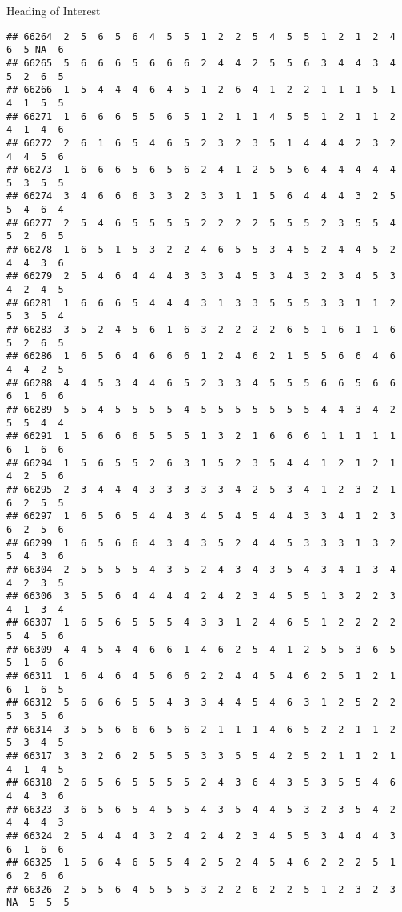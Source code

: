 \documentclass[
  ignorenonframetext,
]{beamer}
\begin{document}
\begin{frame}[fragile]{Heading of Interest}
\begin{verbatim}
## 66264  2  5  6  5  6  4  5  5  1  2  2  5  4  5  5  1  2  1  2  4  6  5 NA  6
## 66265  5  6  6  6  5  6  6  6  2  4  4  2  5  5  6  3  4  4  3  4  5  2  6  5
## 66266  1  5  4  4  4  6  4  5  1  2  6  4  1  2  2  1  1  1  5  1  4  1  5  5
## 66271  1  6  6  6  5  5  6  5  1  2  1  1  4  5  5  1  2  1  1  2  4  1  4  6
## 66272  2  6  1  6  5  4  6  5  2  3  2  3  5  1  4  4  4  2  3  2  4  4  5  6
## 66273  1  6  6  6  5  6  5  6  2  4  1  2  5  5  6  4  4  4  4  4  5  3  5  5
## 66274  3  4  6  6  6  3  3  2  3  3  1  1  5  6  4  4  4  3  2  5  5  4  6  4
## 66277  2  5  4  6  5  5  5  5  2  2  2  2  5  5  5  2  3  5  5  4  5  2  6  5
## 66278  1  6  5  1  5  3  2  2  4  6  5  5  3  4  5  2  4  4  5  2  4  4  3  6
## 66279  2  5  4  6  4  4  4  3  3  3  4  5  3  4  3  2  3  4  5  3  4  2  4  5
## 66281  1  6  6  6  5  4  4  4  3  1  3  3  5  5  5  3  3  1  1  2  5  3  5  4
## 66283  3  5  2  4  5  6  1  6  3  2  2  2  2  6  5  1  6  1  1  6  5  2  6  5
## 66286  1  6  5  6  4  6  6  6  1  2  4  6  2  1  5  5  6  6  4  6  4  4  2  5
## 66288  4  4  5  3  4  4  6  5  2  3  3  4  5  5  5  6  6  5  6  6  6  1  6  6
## 66289  5  5  4  5  5  5  5  4  5  5  5  5  5  5  5  4  4  3  4  2  5  5  4  4
## 66291  1  5  6  6  6  5  5  5  1  3  2  1  6  6  6  1  1  1  1  1  6  1  6  6
## 66294  1  5  6  5  5  2  6  3  1  5  2  3  5  4  4  1  2  1  2  1  4  2  5  6
## 66295  2  3  4  4  4  3  3  3  3  3  4  2  5  3  4  1  2  3  2  1  6  2  5  5
## 66297  1  6  5  6  5  4  4  3  4  5  4  5  4  4  3  3  4  1  2  3  6  2  5  6
## 66299  1  6  5  6  6  4  3  4  3  5  2  4  4  5  3  3  3  1  3  2  5  4  3  6
## 66304  2  5  5  5  5  4  3  5  2  4  3  4  3  5  4  3  4  1  3  4  4  2  3  5
## 66306  3  5  5  6  4  4  4  4  2  4  2  3  4  5  5  1  3  2  2  3  4  1  3  4
## 66307  1  6  5  6  5  5  5  4  3  3  1  2  4  6  5  1  2  2  2  2  5  4  5  6
## 66309  4  4  5  4  4  6  6  1  4  6  2  5  4  1  2  5  5  3  6  5  5  1  6  6
## 66311  1  6  4  6  4  5  6  6  2  2  4  4  5  4  6  2  5  1  2  1  6  1  6  5
## 66312  5  6  6  6  5  5  4  3  3  4  4  5  4  6  3  1  2  5  2  2  5  3  5  6
## 66314  3  5  5  6  6  6  5  6  2  1  1  1  4  6  5  2  2  1  1  2  5  3  4  5
## 66317  3  3  2  6  2  5  5  5  3  3  5  5  4  2  5  2  1  1  2  1  4  1  4  5
## 66318  2  6  5  6  5  5  5  5  2  4  3  6  4  3  5  3  5  5  4  6  4  4  3  6
## 66323  3  6  5  6  5  4  5  5  4  3  5  4  4  5  3  2  3  5  4  2  4  4  4  3
## 66324  2  5  4  4  4  3  2  4  2  4  2  3  4  5  5  3  4  4  4  3  6  1  6  6
## 66325  1  5  6  4  6  5  5  4  2  5  2  4  5  4  6  2  2  2  5  1  6  2  6  6
## 66326  2  5  5  6  4  5  5  5  3  2  2  6  2  2  5  1  2  3  2  3 NA  5  5  5

\end{verbatim}
\end{frame}
\end{document}

